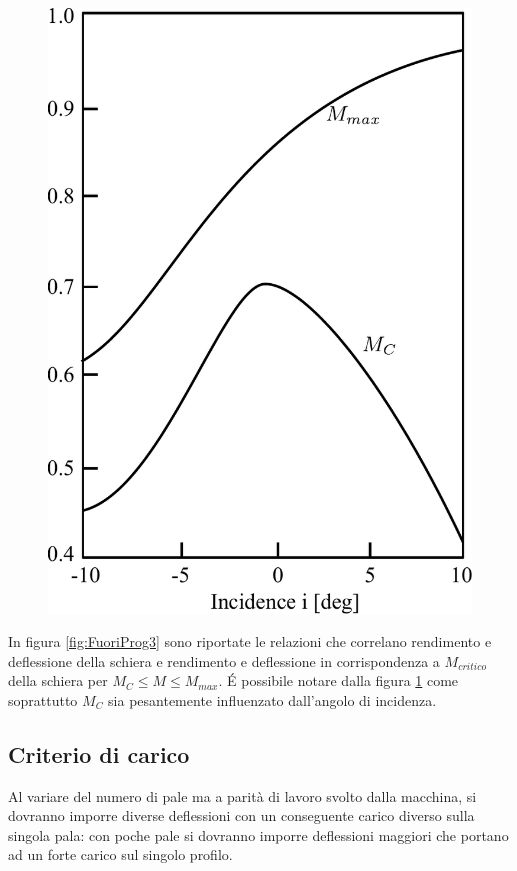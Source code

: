 \begin{figure}[h!]
\begin{minipage}{.4\textwidth}
		\includegraphics[width=\linewidth]{fig/FuoriProg4.pdf}
		\label{fig:FuoriProg4}
	\end{minipage}
\end{figure}

In figura \ref{fig:FuoriProg3} sono riportate le relazioni che correlano rendimento e deflessione della schiera e rendimento e deflessione in corrispondenza a $M_{critico}$ della schiera per $M_C\leq M\leq M_{max}$. \'E possibile notare dalla figura \ref{fig:FuoriProg4} come soprattutto $M_C$ sia pesantemente influenzato dall'angolo di incidenza.

\subsection{Criterio di carico}
Al variare del numero di pale ma a parità di lavoro svolto dalla macchina, si dovranno imporre diverse deflessioni con un conseguente carico diverso sulla singola pala: con poche pale si dovranno imporre deflessioni maggiori che portano ad un forte carico sul singolo profilo.

